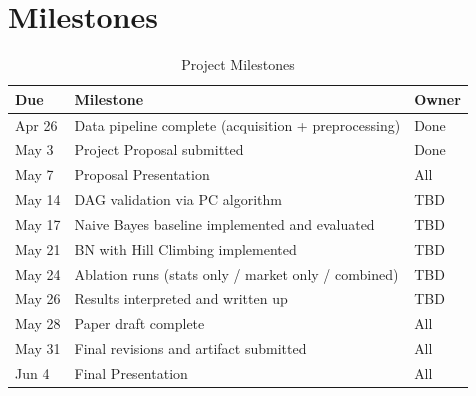 \documentclass[letterpaper]{article}
\begin{document}
\section{Milestones}

\begin{table}[h]
	\centering
	\small
	\caption{Project Milestones}
\begin{tabular}{l p{8cm} l}
		\hline
		\textbf{Due} & \textbf{Milestone} & \textbf{Owner} \\
		\hline
		Apr 26 & Data pipeline complete (acquisition + preprocessing)      & Done \\
		May 3  & Project Proposal submitted                          & Done \\
		May 7  & Proposal Presentation                               & All \\
		May 14 & DAG validation via PC algorithm                     & TBD \\
		May 17 & Naive Bayes baseline implemented and evaluated      & TBD \\
		May 21 & BN with Hill Climbing implemented                   & TBD \\
		May 24 & Ablation runs (stats only / market only / combined) & TBD \\
		May 26 & Results interpreted and written up                  & TBD \\
		May 28 & Paper draft complete                                & All \\
		May 31 & Final revisions and artifact submitted              & All \\
		Jun 4  & Final Presentation                                  & All \\
		\hline
	\end{tabular}
	\label{tab:milestones}
\end{table}
\end{document}
